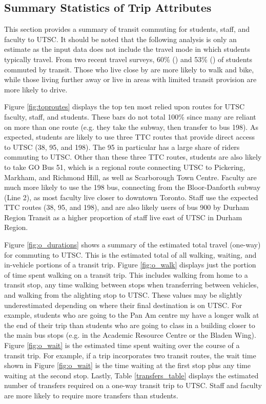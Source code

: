 \documentclass{article}
\begin{document}
	\subsection{Summary Statistics of Trip Attributes}
	
		This section provides a summary of transit commuting for students, staff, and faculty to UTSC. It should be noted that the following analysis is only an estimate as the input data does not include the travel mode in which students typically travel. From two recent travel surveys, 60\% (\cite{smto}) and 53\% (\cite{utsc}) of students commuted by transit. Those who live close by are more likely to walk and bike, while those living further away or live in areas with limited transit provision are more likely to drive. 
		
		Figure \ref{fig:toproutes} displays the top ten most relied upon routes for UTSC faculty, staff, and students. These bars do not total 100\% since many are reliant on more than one route (e.g. they take the subway, then transfer to bus 198). As expected, students are likely to use three TTC routes that provide direct access to UTSC (38, 95, and 198). The 95 in particular has a large share of riders commuting to UTSC. Other than these three TTC routes, students are also likely to take GO Bus 51, which is a regional route connecting UTSC to Pickering, Markham, and Richmond Hill, as well as Scarborough Town Centre. Faculty are much more likely to use the 198 bus, connecting from the Bloor-Danforth subway (Line 2), as most faculty live closer to downtown Toronto. Staff use the expected TTC routes (38, 95, and 198), and are also likely users of bus 900 by Durham Region Transit as a higher proportion of staff live east of UTSC in Durham Region.
		
		Figure \ref{fig:o_durations} shows a summary of the estimated total travel (one-way) for commuting to UTSC. This is the estimated total of all walking, waiting, and in-vehicle portions of a transit trip. Figure \ref{fig:o_walk} displays just the portion of time spent walking on a transit trip. This includes walking from home to a transit stop, any time walking between stops when transferring between vehicles, and walking from the alighting stop to UTSC. These values may be slightly underestimated depending on where their final destination is on UTSC. For example, students who are going to the Pan Am centre my have a longer walk at the end of their trip than students who are going to class in a building closer to the main bus stops (e.g. in the Academic Resource Centre or the Bladen Wing). Figure \ref{fig:o_wait} is the estimated time spent waiting over the course of a transit trip. For example, if a trip incorporates two transit routes, the wait time shown in Figure \ref{fig:o_wait} is the time waiting at the first stop plus any time waiting at the second stop. Lastly, Table \ref{transfers_table} displays the estimated number of transfers required on a one-way transit trip to UTSC. Staff and faculty are more likely to require more transfers than students. 
		
\end{document}
